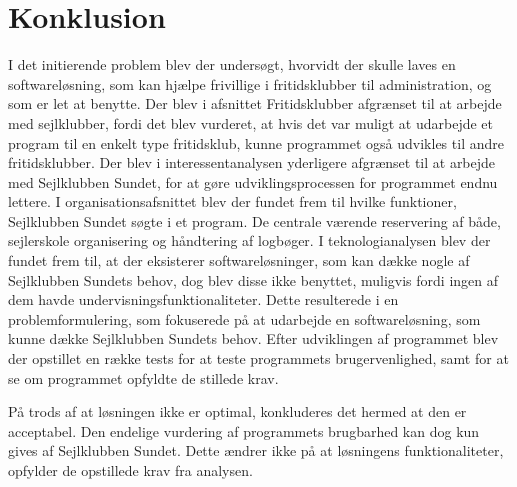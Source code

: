 \chapter{Konklusion}
I det initierende problem blev der undersøgt, hvorvidt der skulle laves en softwareløsning, som kan hjælpe frivillige i fritidsklubber til administration, og som er let at benytte. 
Der blev i afsnittet Fritidsklubber afgrænset til at arbejde med sejlklubber, fordi det blev vurderet, at hvis det var muligt at udarbejde et program til en enkelt type fritidsklub, kunne programmet også udvikles til andre fritidsklubber. 
Der blev i interessentanalysen yderligere afgrænset til at arbejde med Sejlklubben Sundet, for at gøre udviklingsprocessen for programmet endnu lettere.
I organisationsafsnittet blev der fundet frem til hvilke funktioner, Sejlklubben Sundet søgte i et program.
De centrale værende reservering af både, sejlerskole organisering og håndtering af logbøger.
I teknologianalysen blev der fundet frem til, at der eksisterer softwareløsninger, som kan dække nogle af Sejlklubben Sundets behov, dog blev disse ikke benyttet, muligvis fordi ingen af dem havde undervisningsfunktionaliteter. 
Dette resulterede i en problemformulering, som fokuserede på at udarbejde en softwareløsning, som kunne dække Sejlklubben Sundets behov. 
Efter udviklingen af programmet blev der opstillet en række tests for at teste programmets brugervenlighed, samt for at se om programmet opfyldte de stillede krav.

På trods af at løsningen ikke er optimal, konkluderes det hermed at den er acceptabel. 
Den endelige vurdering af programmets brugbarhed kan dog kun gives af Sejlklubben Sundet.
Dette ændrer ikke på at løsningens funktionaliteter, opfylder de opstillede krav fra analysen. 

